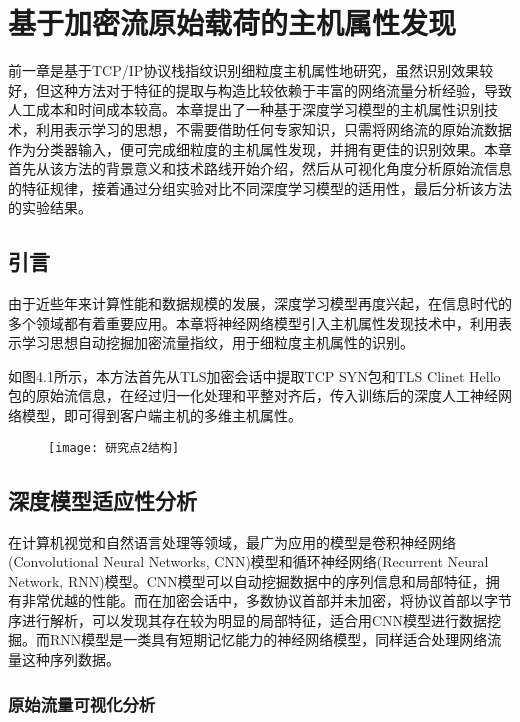 \chapter{基于加密流原始载荷的主机属性发现}

前一章是基于TCP/IP协议栈指纹识别细粒度主机属性地研究，虽然识别效果较好，但这种方法对于特征的提取与构造比较依赖于丰富的网络流量分析经验，导致人工成本和时间成本较高。本章提出了一种基于深度学习模型的主机属性识别技术，利用表示学习的思想，不需要借助任何专家知识，只需将网络流的原始流数据作为分类器输入，便可完成细粒度的主机属性发现，并拥有更佳的识别效果。本章首先从该方法的背景意义和技术路线开始介绍，然后从可视化角度分析原始流信息的特征规律，接着通过分组实验对比不同深度学习模型的适用性，最后分析该方法的实验结果。

\section{引言}

由于近些年来计算性能和数据规模的发展，深度学习模型再度兴起，在信息时代的多个领域都有着重要应用。本章将神经网络模型引入主机属性发现技术中，利用表示学习思想自动挖掘加密流量指纹，用于细粒度主机属性的识别。

如图4.1所示，本方法首先从TLS加密会话中提取TCP SYN包和TLS Clinet Hello包的原始流信息，在经过归一化处理和平整对齐后，传入训练后的深度人工神经网络模型，即可得到客户端主机的多维主机属性。

\begin{figure}[!htbp]
    \centering
    \texttt{[image: 研究点2结构]}
    \label{fig:4-1}
\end{figure}

\section{深度模型适应性分析}

在计算机视觉和自然语言处理等领域，最广为应用的模型是卷积神经网络(Convolutional Neural Networks, CNN)模型和循环神经网络(Recurrent Neural Network, RNN)模型。CNN模型可以自动挖掘数据中的序列信息和局部特征，拥有非常优越的性能。而在加密会话中，多数协议首部并未加密，将协议首部以字节序进行解析，可以发现其存在较为明显的局部特征，适合用CNN模型进行数据挖掘。而RNN模型是一类具有短期记忆能力的神经网络模型，同样适合处理网络流量这种序列数据。

\subsection{原始流量可视化分析}

